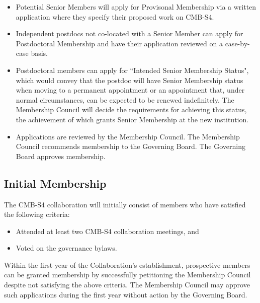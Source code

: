\begin{itemize}

\item Potential Senior Members will apply for Provisonal Membership via a written application where they specify their proposed work on CMB-S4. 

\item Independent postdocs not co-located with a Senior Member can apply for Postdoctoral Membership and have their application reviewed on a case-by-case basis. 

\item Postdoctoral members can apply for ``Intended Senior Membership Status", which would convey that the postdoc will have Senior Membership status when moving to a permanent appointment or an appointment that, under normal circumstances, can be expected to be renewed indefinitely.  The Membership Council will decide the requirements for achieving this status, the achievement of which grants Senior Membership at the new institution.

\item Applications are reviewed by the Membership Council. The Membership Council recommends membership to the Governing Board.  The Governing Board approves membership.

\end{itemize}

\subsection{Initial Membership}
The CMB-S4 collaboration will initially consist of members who have satisfied the following criteria:

\begin{itemize}
\item Attended at least two CMB-S4 collaboration meetings, and 

\item Voted on the governance bylaws.
\end{itemize}

Within the first year of the Collaboration's establishment, prospective members can be granted membership by successfully petitioning the Membership Council despite not satisfying the above criteria.  The Membership Council may approve such applications during the first year without action by the Governing Board.  

